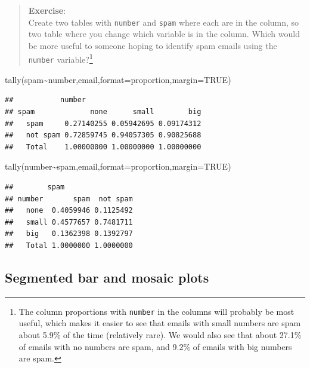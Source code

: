 \documentclass[
]{book}
\newenvironment{Shaded}{\begin{snugshade}}{\end{snugshade}}
\newcommand{\AttributeTok}[1]{\textcolor[rgb]{0.77,0.63,0.00}{#1}}
\newcommand{\ConstantTok}[1]{\textcolor[rgb]{0.00,0.00,0.00}{#1}}
\newcommand{\FunctionTok}[1]{\textcolor[rgb]{0.00,0.00,0.00}{#1}}
\newcommand{\NormalTok}[1]{#1}
\newcommand{\SpecialCharTok}[1]{\textcolor[rgb]{0.00,0.00,0.00}{#1}}
\newcommand{\StringTok}[1]{\textcolor[rgb]{0.31,0.60,0.02}{#1}}
\begin{document}
\begin{quote}
\textbf{Exercise}:\\
Create two tables with \texttt{number} and \texttt{spam} where each are in the column, so two table where you change which variable is in the column. Which would be more useful to someone hoping to identify spam emails using the \texttt{number} variable?\footnote{The column proportions with \texttt{number} in the columns will probably be most useful, which makes it easier to see that emails with small numbers are spam about 5.9\% of the time (relatively rare). We would also see that about 27.1\% of emails with no numbers are spam, and 9.2\% of emails with big numbers are spam.}
\end{quote}

\begin{Shaded}
\begin{Highlighting}[]
\FunctionTok{tally}\NormalTok{(spam}\SpecialCharTok{\textasciitilde{}}\NormalTok{number,email,}\AttributeTok{format=}\StringTok{\textquotesingle{}proportion\textquotesingle{}}\NormalTok{,}\AttributeTok{margin=}\ConstantTok{TRUE}\NormalTok{)}
\end{Highlighting}
\end{Shaded}

\begin{verbatim}
##           number
## spam             none      small        big
##   spam     0.27140255 0.05942695 0.09174312
##   not spam 0.72859745 0.94057305 0.90825688
##   Total    1.00000000 1.00000000 1.00000000
\end{verbatim}

\begin{Shaded}
\begin{Highlighting}[]
\FunctionTok{tally}\NormalTok{(number}\SpecialCharTok{\textasciitilde{}}\NormalTok{spam,email,}\AttributeTok{format=}\StringTok{\textquotesingle{}proportion\textquotesingle{}}\NormalTok{,}\AttributeTok{margin=}\ConstantTok{TRUE}\NormalTok{)}
\end{Highlighting}
\end{Shaded}

\begin{verbatim}
##        spam
## number       spam  not spam
##   none  0.4059946 0.1125492
##   small 0.4577657 0.7481711
##   big   0.1362398 0.1392797
##   Total 1.0000000 1.0000000
\end{verbatim}

\hypertarget{segmented-bar-and-mosaic-plots}{%
\subsection{Segmented bar and mosaic plots}\label{segmented-bar-and-mosaic-plots}}
\end{document}
